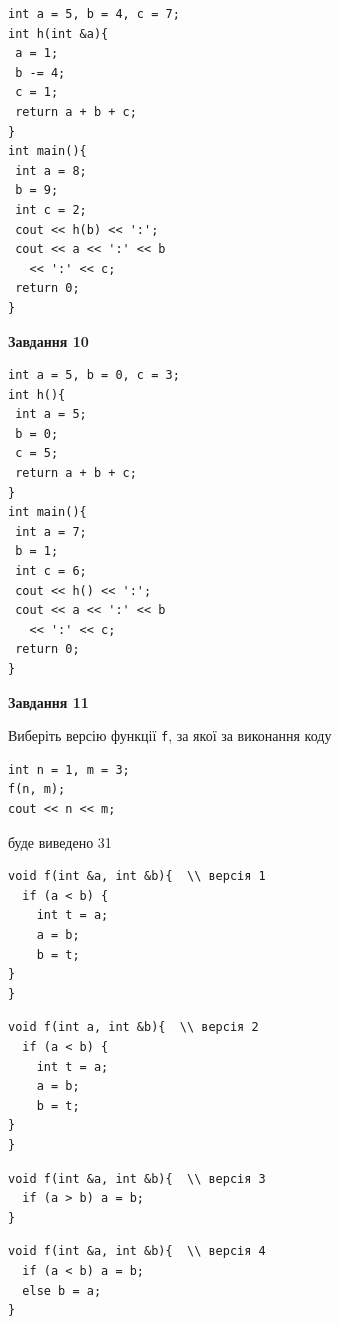 \documentclass[12pt, ukrainian]{article}
\def\code#1{\Verb!#1!}
\begin{document}
{\begin {large}
\begin{minipage}[t]{7.0cm}
\begin{verbatim}
int a = 5, b = 4, c = 7;
int h(int &a){
 a = 1;
 b -= 4;
 c = 1;
 return a + b + c;
}
int main(){
 int a = 8;
 b = 9;
 int c = 2;
 cout << h(b) << ':';
 cout << a << ':' << b 
   << ':' << c;
 return 0;
}
\end{verbatim}



\begin{center}
\textbf{Завдання 10}
\end{center}
\vspace{-8mm}

\begin{verbatim}
int a = 5, b = 0, c = 3;
int h(){
 int a = 5;
 b = 0;
 c = 5;
 return a + b + c;
}
int main(){
 int a = 7;
 b = 1;
 int c = 6;
 cout << h() << ':';
 cout << a << ':' << b 
   << ':' << c;
 return 0;
}
\end{verbatim}

\end{minipage}
\vline \hspace{1mm}
\begin{minipage}[t]{11.0cm}

\begin{center}
\textbf{Завдання 11}
\end{center}
Виберіть версію функції \code{f}, за якої за виконання коду
\begin{verbatim}
int n = 1, m = 3;
f(n, m);
cout << n << m;
\end{verbatim}

буде виведено 31

\begin{verbatim}
void f(int &a, int &b){  \\ версія 1
  if (a < b) {
    int t = a;
    a = b;
    b = t;
}  
}
\end{verbatim}

\vspace{-8mm}\begin{verbatim}
void f(int a, int &b){  \\ версія 2
  if (a < b) {
    int t = a;
    a = b;
    b = t;
}  
}
\end{verbatim}

\vspace{-8mm}\begin{verbatim}
void f(int &a, int &b){  \\ версія 3
  if (a > b) a = b;
}
\end{verbatim}

\vspace{-8mm}\begin{verbatim}
void f(int &a, int &b){  \\ версія 4
  if (a < b) a = b;
  else b = a;
}
\end{verbatim}




\end{minipage}
\end{large}}
\end{document}
